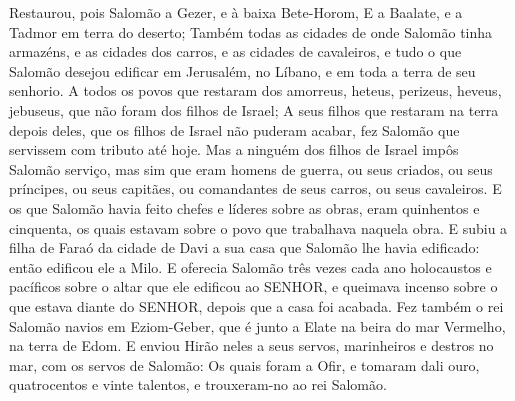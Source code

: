 {  Restaurou, pois Salomão a Gezer, e à baixa Bete-Horom,
  E a Baalate, e a Tadmor em terra do deserto;
  Também todas as cidades de onde Salomão tinha armazéns, e as cidades dos carros, e as cidades de cavaleiros, e tudo o que Salomão desejou edificar em Jerusalém, no Líbano, e em toda a terra de seu senhorio.
  A todos os povos que restaram dos amorreus, heteus, perizeus, heveus, jebuseus, que não foram dos filhos de Israel;
  A seus filhos que restaram na terra depois deles, que os filhos de Israel não puderam acabar, fez Salomão que servissem com tributo até hoje.
  Mas a ninguém dos filhos de Israel impôs Salomão serviço, mas sim que eram homens de guerra, ou seus criados, ou seus príncipes, ou seus capitães, ou comandantes de seus carros, ou seus cavaleiros. %
  E os que Salomão havia feito chefes e líderes sobre as obras, eram quinhentos e cinquenta, os quais estavam sobre o povo que trabalhava naquela obra.
  E subiu a filha de Faraó da cidade de Davi a sua casa que Salomão lhe havia edificado: então edificou ele a Milo.
  E oferecia Salomão três vezes cada ano holocaustos e pacíficos sobre o altar que ele edificou ao SENHOR, e queimava incenso sobre o que estava diante do SENHOR, depois que a casa foi acabada. %
  Fez também o rei Salomão navios em Eziom-Geber, que é junto a Elate na beira do mar Vermelho, na terra de Edom.
  E enviou Hirão neles a seus servos, marinheiros e destros no mar, com os servos de Salomão:
  Os quais foram a Ofir, e tomaram dali ouro, quatrocentos e vinte talentos, e trouxeram-no ao rei Salomão.
\par }

